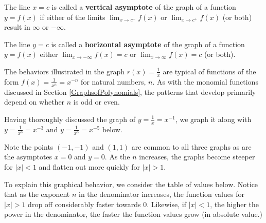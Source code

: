\documentclass{ximera}
\begin{document}

\begin{definition} \label{va} The line $x=c$ is called a \textbf{vertical asymptote} of the graph of a function $y=f(x)$  if either of the limits $\lim_{x \rightarrow c^{-}} f(x)$ or  $\lim_{x \rightarrow c^{+}} f(x)$ (or both) result in $\infty$ or $-\infty$.

\end{definition}





\begin{definition} \label{ha} The line $y=c$ is called a \textbf{horizontal asymptote} of the graph of a function $y=f(x)$ either  $\lim_{x \rightarrow -\infty} f(x)=c$ or  $\lim_{x \rightarrow \infty} f(x)=c$ (or both).
\end{definition}


The behaviors illustrated in the graph $r(x) = \frac{1}{x}$ are typical of functions of the form $f(x) = \frac{1}{x^n} = x^{-n}$ for natural numbers, $n$.  As with the monomial functions discussed in Section \ref{GraphsofPolynomials}, the patterns that develop primarily depend on whether $n$ is odd or even.  


Having thoroughly discussed the graph of $y = \frac{1}{x} = x^{-1}$, we graph it along with $y = \frac{1}{x^3} = x^{-3}$ and $y = \frac{1}{x^5} = x^{-5}$ below.  


\begin{center} 
\end{center}

Note the points $(-1,-1)$ and $(1,1)$ are common to all three graphs as are the asymptotes $x = 0$ and $y = 0$.  As the $n$ increases, the graphs become steeper for $|x| < 1$  and flatten out more quickly for $|x|>1$.  




To explain this graphical behavior, we consider the table of values below.  Notice that as the exponent $n$ in the denominator increases, the function values for $|x|>1$ drop off considerably faster towards $0$.  Likewise, if $|x|<1$, the higher the power in the denominator, the faster the function values grow (in absolute value.)
\end{document}
